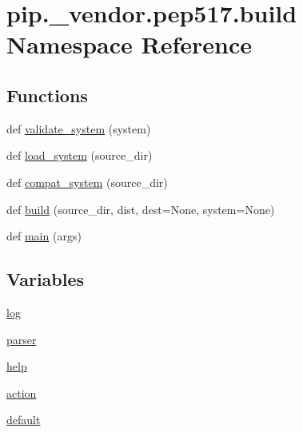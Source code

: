 \hypertarget{namespacepip_1_1__vendor_1_1pep517_1_1build}{}\section{pip.\+\_\+vendor.\+pep517.\+build Namespace Reference}
\label{namespacepip_1_1__vendor_1_1pep517_1_1build}
\subsection*{Functions}
\begin{DoxyCompactItemize}
\item 
def \hyperlink{namespacepip_1_1__vendor_1_1pep517_1_1build_ae8c3647d1dec58659de94743307b912e}{validate\+\_\+system} (system)
\item 
def \hyperlink{namespacepip_1_1__vendor_1_1pep517_1_1build_a947629dd0956e56b2c1c7e0119bb8124}{load\+\_\+system} (source\+\_\+dir)
\item 
def \hyperlink{namespacepip_1_1__vendor_1_1pep517_1_1build_ac17573f87b3f31c04bf634150ef5f368}{compat\+\_\+system} (source\+\_\+dir)
\item 
def \hyperlink{namespacepip_1_1__vendor_1_1pep517_1_1build_aabcc54a837545e9cadf3ab91aaa6a611}{build} (source\+\_\+dir, dist, dest=None, system=None)
\item 
def \hyperlink{namespacepip_1_1__vendor_1_1pep517_1_1build_aa3bf9002f1471764cf8359ec8a9e5ce0}{main} (args)
\end{DoxyCompactItemize}
\subsection*{Variables}
\begin{DoxyCompactItemize}
\item 
\hyperlink{namespacepip_1_1__vendor_1_1pep517_1_1build_a7467ff642f69ca992afb884de5974812}{log}
\item 
\hyperlink{namespacepip_1_1__vendor_1_1pep517_1_1build_ae881c344a56185303239155da09abfc6}{parser}
\item 
\hyperlink{namespacepip_1_1__vendor_1_1pep517_1_1build_a13e317f500e061959aabfae774114463}{help}
\item 
\hyperlink{namespacepip_1_1__vendor_1_1pep517_1_1build_a39b21193847f339149e48542484724c3}{action}
\item 
\hyperlink{namespacepip_1_1__vendor_1_1pep517_1_1build_a0e44cd200daee3b36dea2c5252d52c97}{default}
\end{DoxyCompactItemize}


